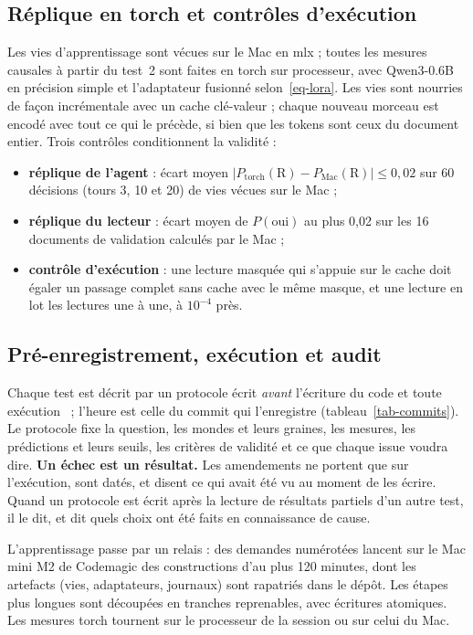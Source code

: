\documentclass[11pt,a4paper]{article}
\begin{document}
\subsection{Réplique en torch et contrôles d'exécution}
\label{sec-replica}

Les vies d'apprentissage sont vécues sur le Mac en mlx ; toutes les mesures
causales à partir du test~2 sont faites en torch sur processeur, avec Qwen3-0.6B
en précision simple et l'adaptateur fusionné selon~\eqref{eq-lora}. Les vies sont
nourries de façon incrémentale avec un cache clé-valeur ; chaque nouveau morceau
est encodé avec tout ce qui le précède, si bien que les tokens sont ceux du
document entier. Trois contrôles conditionnent la validité :
\begin{itemize}
\item \textbf{réplique de l'agent} : écart moyen $|P_\text{torch}(\mathrm R)-
P_\text{Mac}(\mathrm R)|\le 0,02$ sur 60 décisions (tours 3, 10 et 20) de vies
vécues sur le Mac ;
\item \textbf{réplique du lecteur} : écart moyen de $P(\text{oui})$ au plus 0,02
sur les 16 documents de validation calculés par le Mac ;
\item \textbf{contrôle d'exécution} : une lecture masquée qui s'appuie sur le cache
doit égaler un passage complet sans cache avec le même masque, et une lecture en
lot les lectures une à une, à $10^{-4}$ près.
\end{itemize}

\subsection{Pré-enregistrement, exécution et audit}
\label{sec-prereg}

Chaque test est décrit par un protocole écrit \emph{avant} l'écriture du code et
toute exécution~\cite{nosek2018} ; l'heure est celle du commit qui l'enregistre
(tableau~\ref{tab-commits}). Le protocole fixe la question, les mondes et leurs
graines, les mesures, les prédictions et leurs seuils, les critères de validité et
ce que chaque issue voudra dire. \textbf{Un échec est un résultat.} Les amendements
ne portent que sur l'exécution, sont datés, et disent ce qui avait été vu au moment
de les écrire. Quand un protocole est écrit après la lecture de résultats partiels
d'un autre test, il le dit, et dit quels choix ont été faits en connaissance de
cause.

L'apprentissage passe par un relais : des demandes numérotées lancent sur le Mac
mini M2 de Codemagic des constructions d'au plus 120 minutes, dont les artefacts
(vies, adaptateurs, journaux) sont rapatriés dans le dépôt. Les étapes plus longues
sont découpées en tranches reprenables, avec écritures atomiques. Les mesures
torch tournent sur le processeur de la session ou sur celui du Mac.
\end{document}
